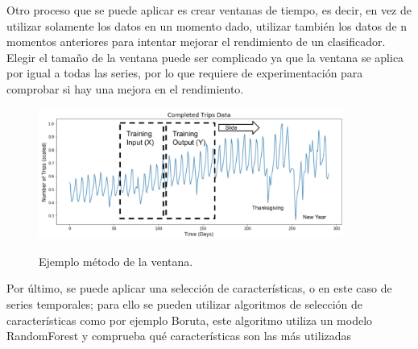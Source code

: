 Otro proceso que se puede aplicar es crear ventanas de tiempo, es decir, en vez de utilizar solamente los datos en un momento dado, utilizar también los datos de n momentos anteriores para intentar mejorar el rendimiento de un clasificador. Elegir el tamaño de la ventana puede ser complicado ya que la ventana se aplica por igual a todas las series, por lo que requiere de experimentación para comprobar si hay una mejora en el rendimiento.\newline


\begin{figure}[h]
	\centering
	\includegraphics[width=100mm]{imagenes/sliding_window_ts.png}
	\label{fig:52}
	\caption{Ejemplo método de la ventana.}
\end{figure}
\verticalspace

Por último, se puede aplicar una selección de características, o en este caso de series temporales; para ello se pueden utilizar algoritmos de selección de características como por ejemplo Boruta, este algoritmo utiliza un modelo RandomForest y comprueba qué características son las más utilizadas 
